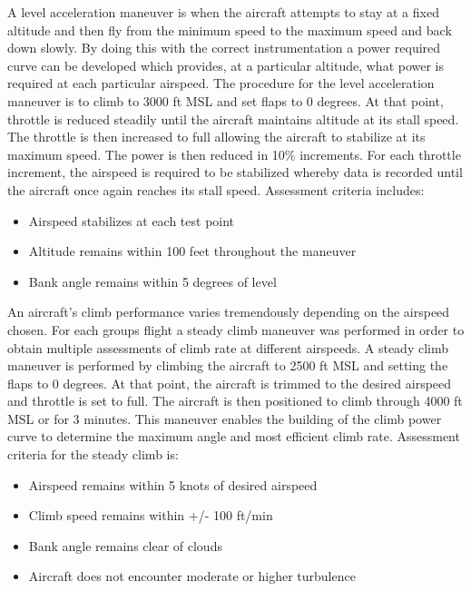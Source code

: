 \documentclass[conf]{new-aiaa}
\begin{document}
\medskip

A level acceleration maneuver is when the aircraft attempts to stay at a fixed altitude and then fly from the minimum speed to the maximum speed and back down slowly. By doing this with the correct instrumentation a power required curve can be developed which provides, at a particular altitude, what power is required at each particular airspeed. The procedure for the level acceleration maneuver is to climb to 3000 ft MSL and set flaps to 0 degrees. At that point, throttle is reduced steadily until the aircraft maintains altitude at its stall speed. The throttle is then increased to full allowing the aircraft to stabilize at its maximum speed. The power is then reduced in 10\% increments. For each throttle increment, the airspeed is required to be stabilized whereby data is recorded until the aircraft once again reaches its stall speed. Assessment criteria includes: 

\medskip

\begin{itemize}
\item Airspeed stabilizes at each test point
\item Altitude remains within 100 feet throughout the maneuver
\item Bank angle remains within 5 degrees of level
\end{itemize}

\medskip

An aircraft's climb performance varies tremendously depending on the airspeed chosen. For each groups flight a steady climb maneuver was performed in order to obtain multiple assessments of climb rate at different airspeeds. A steady climb maneuver is performed by climbing the aircraft to 2500 ft MSL and setting the flaps to 0 degrees. At that point, the aircraft is trimmed to the desired airspeed and throttle is set to full. The aircraft is then positioned to climb through 4000 ft MSL or for 3 minutes. This maneuver enables the building of the climb power curve to determine the maximum angle and most efficient climb rate. Assessment criteria for the steady climb is:

\medskip
\begin{itemize}
\item Airspeed remains within 5 knots of desired airspeed
\item Climb speed remains within +/- 100 ft/min
\item Bank angle remains clear of clouds
\item Aircraft does not encounter moderate or higher turbulence
\end{itemize}
\end{document}
